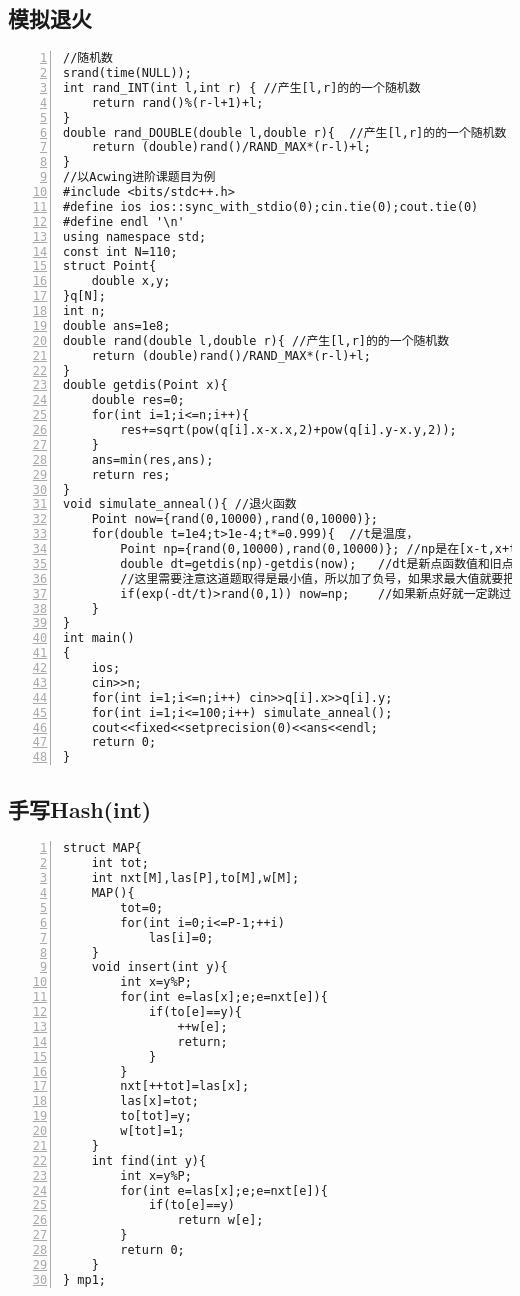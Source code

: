 \subsection{模拟退火}
\begin{lstlisting}[language={[ANSI]C},numbers=left]
//随机数
srand(time(NULL));
int rand_INT(int l,int r) {	//产生[l,r]的的一个随机数
	return rand()%(r-l+1)+l;
}
double rand_DOUBLE(double l,double r){	//产生[l,r]的的一个随机数
	return (double)rand()/RAND_MAX*(r-l)+l;
}
//以Acwing进阶课题目为例
#include <bits/stdc++.h>
#define ios ios::sync_with_stdio(0);cin.tie(0);cout.tie(0)
#define endl '\n'
using namespace std;
const int N=110;
struct Point{
	double x,y;
}q[N];
int n;
double ans=1e8;
double rand(double l,double r){	//产生[l,r]的的一个随机数
	return (double)rand()/RAND_MAX*(r-l)+l;
}
double getdis(Point x){
	double res=0;
	for(int i=1;i<=n;i++){
		res+=sqrt(pow(q[i].x-x.x,2)+pow(q[i].y-x.y,2));
	}
	ans=min(res,ans);
	return res;
}
void simulate_anneal(){	//退火函数
	Point now={rand(0,10000),rand(0,10000)};
	for(double t=1e4;t>1e-4;t*=0.999){	//t是温度，
		Point np={rand(0,10000),rand(0,10000)};	//np是在[x-t,x+t]范围内产生的新点
		double dt=getdis(np)-getdis(now);	//dt是新点函数值和旧点函数值的差值
        //这里需要注意这道题取得是最小值，所以加了负号，如果求最大值就要把负号去掉！！
		if(exp(-dt/t)>rand(0,1)) now=np;	//如果新点好就一定跳过去，否则以一定概率跳过去
	}
}
int main()
{
    ios;
    cin>>n;
    for(int i=1;i<=n;i++) cin>>q[i].x>>q[i].y;
    for(int i=1;i<=100;i++) simulate_anneal();
    cout<<fixed<<setprecision(0)<<ans<<endl;
    return 0;
}
\end{lstlisting}
\subsection{手写Hash(int)}
\begin{lstlisting}[language={[ANSI]C},numbers=left]
struct MAP{
    int tot;
    int nxt[M],las[P],to[M],w[M];
    MAP(){
        tot=0;
        for(int i=0;i<=P-1;++i)
            las[i]=0;
    }
    void insert(int y){
        int x=y%P;
        for(int e=las[x];e;e=nxt[e]){
            if(to[e]==y){
                ++w[e];
                return;
            }
        }
        nxt[++tot]=las[x];
        las[x]=tot;
        to[tot]=y;
        w[tot]=1;
    }
    int find(int y){
        int x=y%P;
        for(int e=las[x];e;e=nxt[e]){
            if(to[e]==y)
                return w[e];
        }
        return 0;
    }
} mp1;
\end{lstlisting}

